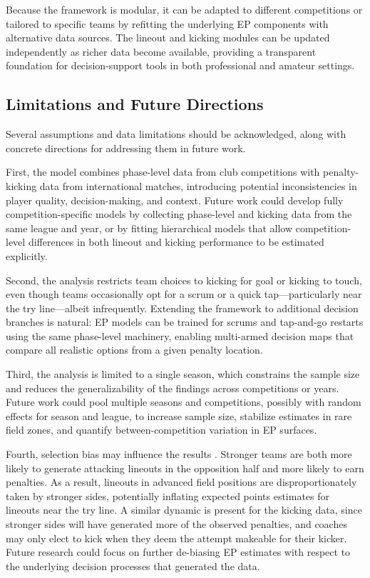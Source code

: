 \documentclass[12pt]{article}
\begin{document}
Because the framework is modular, it can be adapted to different competitions or tailored to specific teams by refitting the underlying EP components with alternative data sources. The lineout and kicking modules can be updated independently as richer data become available, providing a transparent foundation for decision-support tools in both professional and amateur settings.

\subsection{Limitations and Future Directions}

Several assumptions and data limitations should be acknowledged, along with concrete directions for addressing them in future work.

First, the model combines phase-level data from club competitions with penalty-kicking data from international matches, introducing potential inconsistencies in player quality, decision-making, and context. Future work could develop fully competition-specific models by collecting phase-level and kicking data from the same league and year, or by fitting hierarchical models that allow competition-level differences in both lineout and kicking performance to be estimated explicitly.

Second, the analysis restricts team choices to kicking for goal or kicking to touch, even though teams occasionally opt for a scrum or a quick tap---particularly near the try line---albeit infrequently. Extending the framework to additional decision branches is natural: EP models can be trained for scrums and tap-and-go restarts using the same phase-level machinery, enabling multi-armed decision maps that compare all realistic options from a given penalty location.

Third, the analysis is limited to a single season, which constrains the sample size and reduces the generalizability of the findings across competitions or years. Future work could pool multiple seasons and competitions, possibly with random effects for season and league, to increase sample size, stabilize estimates in rare field zones, and quantify between-competition variation in EP surfaces.

Fourth, selection bias may influence the results \citep{BrillYurkoWyner2025}. Stronger teams are both more likely to generate attacking lineouts in the opposition half and more likely to earn penalties. As a result, lineouts in advanced field positions are disproportionately taken by stronger sides, potentially inflating expected points estimates for lineouts near the try line. A similar dynamic is present for the kicking data, since stronger sides will have generated more of the observed penalties, and coaches may only elect to kick when they deem the attempt makeable for their kicker. Future research could focus on further de-biasing EP estimates with respect to the underlying decision processes that generated the data.
\end{document}
